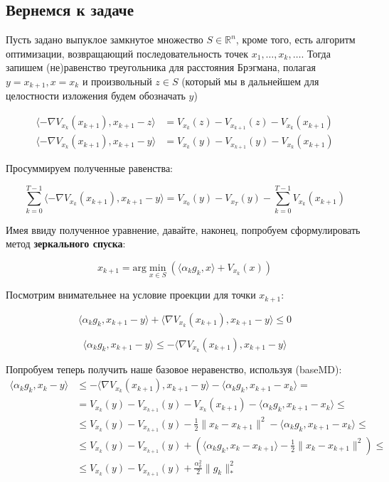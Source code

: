 \documentclass[a4paper,12pt]{article}
\theoremstyle{plain} %
\theoremstyle{definition} %
\theoremstyle{remark} %
\theoremstyle{definition}
\theoremstyle{definition}
\let\leq\leqslant
\begin{document}
\subsection{Вернемся к задаче}

Пусть задано выпуклое замкнутое множество $S \in \mathbb{R}^n$, кроме того, есть алгоритм оптимизации, возвращающий последовательность точек $x_1, \ldots, x_k, \ldots$. Тогда запишем (не)равенство треугольника для расстояния Брэгмана, полагая $y = x_{k+1}, x = x_k$ и произвольный $z \in S$ (который мы в дальнейшем для целостности изложения будем обозначать $y$)

\begin{align*}
\langle -\nabla V_{x_k}(x_{k+1}), x_{k+1}-z\rangle &= V_{x_k}(z) - V_{x_{k+1}}(z) - V_{x_k}(x_{k+1}) \\
\tag{baseMD}
\langle -\nabla V_{x_k}(x_{k+1}), x_{k+1}-y\rangle &= V_{x_k}(y) - V_{x_{k+1}}(y) - V_{x_k}(x_{k+1})
\end{align*}

Просуммируем полученные равенства:

$$
\sum\limits_{k = 0}^{T-1}\langle -\nabla V_{x_k}(x_{k+1}), x_{k+1}-y\rangle = V_{x_0}(y) - V_{x_{T}}(y) - \sum\limits_{k = 0}^{T-1}V_{x_k}(x_{k+1})
$$

Имея ввиду полученное уравнение, давайте, наконец, попробуем сформулировать метод \textbf{зеркального спуска}:

$$
x_{k+1} = \text{arg}\min\limits_{x \in S} \left( \langle \alpha_k g_k, x \rangle + V_{x_k}(x) \right)
$$

Посмотрим внимательнее на условие проекции для точки $x_{k+1}$:

$$
\langle \alpha_k g_k,x_{k+1} - y\rangle + \langle \nabla V_{x_k}(x_{k+1}),x_{k+1} - y\rangle \leq 0
$$

$$
\langle \alpha_k g_k,x_{k+1} - y\rangle \leq - \langle \nabla V_{x_k}(x_{k+1}),x_{k+1} - y\rangle 
$$

Попробуем теперь получить наше базовое неравенство, используя (baseMD):
\begin{align*}
\langle \alpha_k g_k, x_k - y\rangle &\leq - \langle \nabla V_{x_k}(x_{k+1}),x_{k+1} - y\rangle - \langle \alpha_k g_k, x_{k+1} - x_k\rangle = \\
& = V_{x_k}(y) - V_{x_{k+1}}(y) - V_{x_k}(x_{k+1})- \langle \alpha_k g_k, x_{k+1} - x_k\rangle \leq\\
&\leq V_{x_k}(y) - V_{x_{k+1}}(y) - \frac{1}{2}\|x_k - x_{k+1}\|^2- \langle \alpha_k g_k, x_{k+1} - x_k\rangle \leq \\
&\leq V_{x_k}(y) - V_{x_{k+1}}(y) + \left(\langle \alpha_k g_k, x_k - x_{k+1}\rangle- \frac{1}{2}\|x_k - x_{k+1}\|^2 \right) \leq \\
&\leq V_{x_k}(y) - V_{x_{k+1}}(y) + \frac{\alpha_k^2}{2} \|g_k\|_*^2
\end{align*}
\end{document}
